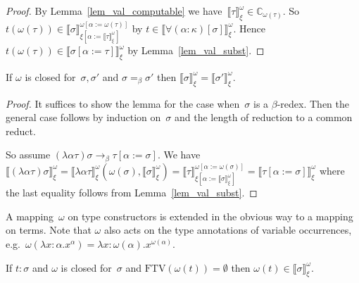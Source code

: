 \documentclass[runningheads,a4paper]{llncs}
\newcommand{\subst}[2]{#1:=#2}
\newcommand{\FTV}{\mathrm{FTV}}
\newcommand{\Cb}{\mathbb{C}}
\newcommand{\val}[3]{\ensuremath{\llbracket#1\rrbracket_{#2}^{#3}}}
\begin{document}
\begin{proof}
  By Lemma~\ref{lem_val_computable} we have~$\val{\tau}{\xi}{\omega}
  \in \Cb_{\omega(\tau)}$. So $t (\omega(\tau)) \in
  \val{\sigma}{\xi[\subst{\alpha}{\val{\tau}{\xi}{\omega}}]}{\omega[\subst{\alpha}{\omega(\tau)}]}$
  by $t \in \val{\forall(\alpha:\kappa)[\sigma]}{\xi}{\omega}$. Hence
  $t (\omega(\tau)) \in
  \val{\sigma[\subst{\alpha}{\tau}]}{\xi}{\omega}$ by
  Lemma~\ref{lem_val_subst}.
\end{proof}

\begin{lemma}\label{lem_beta_val}
  If $\omega$ is closed for~$\sigma,\sigma'$ and $\sigma =_\beta
  \sigma'$ then $\val{\sigma}{\xi}{\omega} =
  \val{\sigma'}{\xi}{\omega}$.
\end{lemma}

\begin{proof}
  It suffices to show the lemma for the case when~$\sigma$ is a
  $\beta$-redex. Then the general case follows by induction
  on~$\sigma$ and the length of reduction to a common reduct.

  So assume $(\lambda\alpha\tau)\sigma \to_\beta
  \tau[\subst{\alpha}{\sigma}]$. We have
  $\val{(\lambda\alpha\tau)\sigma}{\xi}{\omega} =
  \val{\lambda\alpha\tau}{\xi}{\omega}(\omega(\sigma),
  \val{\sigma}{\xi}{\omega}) =
  \val{\tau}{\xi[\subst{\alpha}{\val{\sigma}{\xi}{\omega}}]}{\omega[\subst{\alpha}{\omega(\sigma)}]}
  = \val{\tau[\subst{\alpha}{\sigma}]}{\xi}{\omega}$ where the last
  equality follows from Lemma~\ref{lem_val_subst}.
\end{proof}

A mapping~$\omega$ on type constructors is extended in the obvious way
to a mapping on terms. Note that $\omega$ also acts on the type
annotations of variable occurrences, e.g.~$\omega(\lambda x : \alpha
. x^\alpha) = \lambda x : \omega(\alpha) . x^{\omega(\alpha)}$.

\begin{lemma}\label{lem_typable_computable}
  If $t : \sigma$ and $\omega$ is closed for~$\sigma$ and
  $\FTV(\omega(t)) = \emptyset$ then $\omega(t) \in
  \val{\sigma}{\xi}{\omega}$.
\end{lemma}
\end{document}
